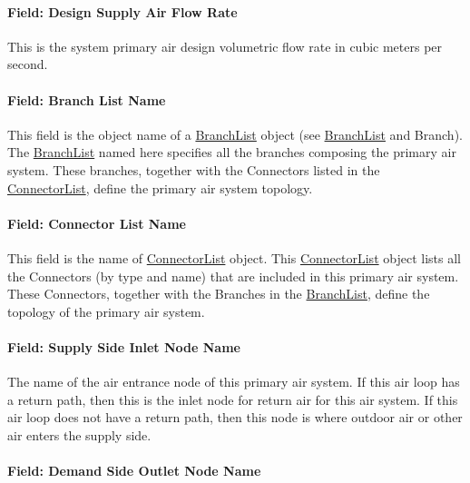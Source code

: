 \paragraph{Field: Design Supply Air Flow Rate}\label{field-design-supply-air-flow-rate}

This is the system primary air design volumetric flow rate in cubic meters per second.

\paragraph{Field: Branch List Name}\label{field-branch-list-name}

This field is the object name of a \hyperref[branchlist]{BranchList} object (see \hyperref[branchlist]{BranchList} and Branch). The \hyperref[branchlist]{BranchList} named here specifies all the branches composing the primary air system. These branches, together with the Connectors listed in the \hyperref[connectorlist]{ConnectorList}, define the primary air system topology.

\paragraph{Field: Connector List Name}\label{field-connector-list-name}

This field is the name of \hyperref[connectorlist]{ConnectorList} object. This \hyperref[connectorlist]{ConnectorList} object lists all the Connectors (by type and name) that are included in this primary air system. These Connectors, together with the Branches in the \hyperref[branchlist]{BranchList}, define the topology of the primary air system.

\paragraph{Field: Supply Side Inlet Node Name}\label{field-supply-side-inlet-node-name}

The name of the air entrance node of this primary air system. If this air loop has a return path, then this is the inlet node for return air for this air system. If this air loop does not have a return path, then this node is where outdoor air or other air enters the supply side.

\paragraph{Field: Demand Side Outlet Node Name}\label{field-demand-side-outlet-node-name}

